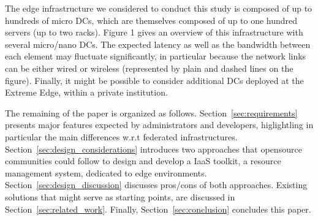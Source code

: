 The edge infrastructure we considered to conduct this study is
composed of up to hundreds of micro DCs, which are themselves composed
of up to one hundred servers (up to two racks).  Figure 1 gives an
overview of this infrastructure with several micro/nano DCs. The
expected latency as well as the bandwidth between each element may
fluctuate significantly, in particular because the network links can
be either wired or wireless (represented by plain and dashed lines on
the figure). Finally, it might be possible to consider additional DCs
deployed at the Extreme Edge, within a private institution.


The remaining of the paper is organized as
follows. Section~\ref{sec:requirements} presents major features expected by administrators and developers, higlightling in particular the main differences
w.r.t federated infrastructures.
Section~\ref{sec:design_considerations} introduces two approaches
that opensource communities could follow to design and develop a IaaS
toolkit, \aka a resource management system, dedicated to edge
environments. Section~\ref{sec:design_discussion} discusses pros/cons
of both approaches. Existing solutions that might serve as
starting points, are discussed in
Section~\ref{sec:related_work}. Finally, Section~\ref{sec:conclusion} concludes this paper.




